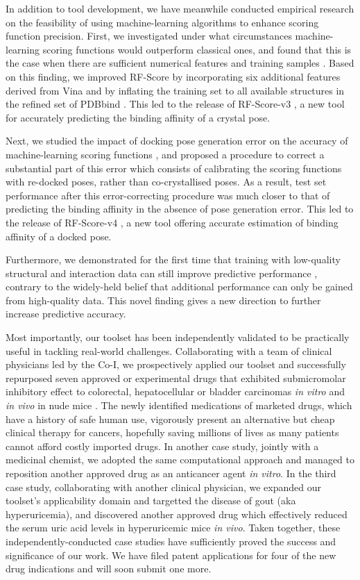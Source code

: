 \documentclass[a4paper,12pt]{article}
\begin{document}
In addition to tool development, we have meanwhile conducted empirical research on the feasibility of using machine-learning algorithms to enhance scoring function precision. First, we investigated under what circumstances machine-learning scoring functions would outperform classical ones, and found that this is the case when there are sufficient numerical features and training samples \citep{1432}. Based on this finding, we improved RF-Score by incorporating six additional features derived from Vina and by inflating the training set to all available structures in the refined set of PDBbind \citep{1633}. This led to the release of RF-Score-v3 \citep{1647}, a new tool for accurately predicting the binding affinity of a crystal pose.

Next, we studied the impact of docking pose generation error on the accuracy of machine-learning scoring functions \citep{1795,1797,1434}, and proposed a procedure to correct a substantial part of this error which consists of calibrating the scoring functions with re-docked poses, rather than co-crystallised poses. As a result, test set performance after this error-correcting procedure was much closer to that of predicting the binding affinity in the absence of pose generation error. This led to the release of RF-Score-v4 \citep{1795}, a new tool offering accurate estimation of binding affinity of a docked pose.

Furthermore, we demonstrated for the first time that training with low-quality structural and interaction data can still improve predictive performance \citep{1663}, contrary to the widely-held belief that additional performance can only be gained from high-quality data. This novel finding gives a new direction to further increase predictive accuracy.

Most importantly, our toolset has been independently validated to be practically useful in tackling real-world challenges. Collaborating with a team of clinical physicians led by the Co-I, we prospectively applied our toolset and successfully repurposed seven approved or experimental drugs that exhibited submicromolar inhibitory effect to colorectal, hepatocellular or bladder carcinomas \textit{in vitro} and \textit{in vivo} in nude mice \citep{1667,1681}. The newly identified medications of marketed drugs, which have a history of safe human use, vigorously present an alternative but cheap clinical therapy for cancers, hopefully saving millions of lives as many patients cannot afford costly imported drugs. In another case study, jointly with a medicinal chemist, we adopted the same computational approach and managed to reposition another approved drug as an anticancer agent \textit{in vitro}. In the third case study, collaborating with another clinical physician, we expanded our toolset's applicability domain and targetted the disease of gout (aka hyperuricemia), and discovered another approved drug which effectively reduced the serum uric acid levels in hyperuricemic mice \textit{in vivo}. Taken together, these independently-conducted case studies have sufficiently proved the success and significance of our work. We have filed patent applications for four of the new drug indications and will soon submit one more.
\end{document}
